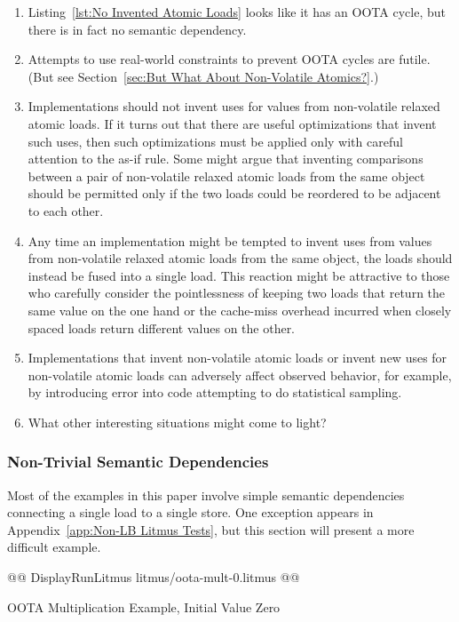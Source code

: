 \documentclass[10]{article}
\begin{document}
\begin{enumerate}
\item	Listing~\ref{lst:No Invented Atomic Loads}
	looks like it has an OOTA cycle, but there is in fact no
	semantic dependency.
\item	Attempts to use real-world constraints to prevent OOTA cycles
	are futile.
	(But see Section~\ref{sec:But What About Non-Volatile Atomics?}.)
\item	Implementations should not invent uses for values from
	non-volatile relaxed atomic loads.
	If it turns out that there are useful optimizations that invent
	such uses, then such optimizations must be applied only with
	careful attention to the as-if rule.
	Some might argue that inventing comparisons between a pair of
	non-volatile relaxed atomic loads from the same object should
	be permitted only if the two loads could be reordered to be
	adjacent to each other.
\item	Any time an implementation might be tempted to invent uses from
	values from non-volatile relaxed atomic loads from the same
	object, the loads should instead be fused into a single load.
	This reaction might be attractive to those who carefully consider
	the pointlessness of keeping two loads that return the same value
	on the one hand or the cache-miss overhead incurred when closely
	spaced loads return different values on the other.
\item	Implementations that invent non-volatile atomic loads or invent
	new uses for non-volatile atomic loads can adversely affect
	observed behavior, for example, by introducing error into code
	attempting to do statistical sampling.
\item	What other interesting situations might come to light?
\end{enumerate}

\subsubsection{Non-Trivial Semantic Dependencies}
\label{app:Non-Trivial Semantic Dependencies}

Most of the examples in this paper involve simple semantic dependencies
connecting a single load to a single store.
One exception appears in
Appendix~\ref{app:Non-LB Litmus Tests},
but this section will present a more difficult example.

\begin{listing}[tbp]
@@ DisplayRunLitmus litmus/oota-mult-0.litmus @@
\caption{OOTA Multiplication Example, Initial Value Zero}
\label{lst:OOTA Multiplication Example, Initial Value Zero}
\end{listing}
\end{document}
